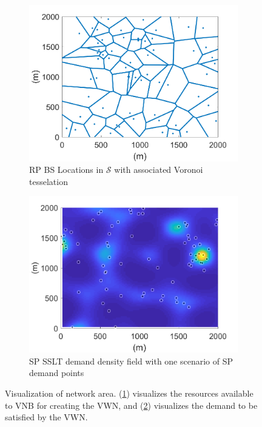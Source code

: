 \documentclass[conference]{IEEEtran}
\begin{document}
\begin{figure}[h]
\centering
\begin{subfigure}{.45\textwidth}
	\centering
	\includegraphics[width=1\linewidth]{Figures/BSLocationsVoronoi}
	\caption{RP BS Locations in $\mathcal{S}$ with associated Voronoi tesselation}
	\label{fig:BSLocVor}
\end{subfigure}
\hspace{0.5cm}
\begin{subfigure}{.45\textwidth}
	\centering
	\includegraphics[width=1\linewidth]{Figures/SSLTnsPPP_demandpointreal}
	\caption{SP SSLT demand density field with one scenario of SP demand points}
	\label{fig:SSLTDPReal}
\end{subfigure}
\caption{Visualization of network area.  (\ref{fig:BSLocVor}) visualizes the resources available to VNB for creating the VWN, and (\ref{fig:SSLTDPReal}) visualizes the demand to be satisfied by the VWN.}
\label{fig:NetworkArea}
\end{figure}
\end{document}
